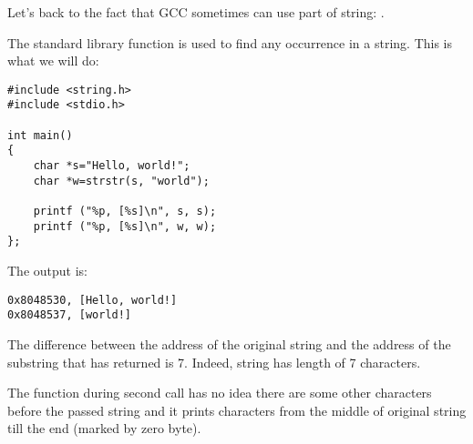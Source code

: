 \label{strstr_example}

Let's back to the fact that GCC sometimes can use part of string: .

The  \CCpp standard library function is used to find any occurrence in a string.
This is what we will do:

\begin{lstlisting}[style=customc]
#include <string.h>
#include <stdio.h>

int main()
{
	char *s="Hello, world!";
	char *w=strstr(s, "world");

	printf ("%p, [%s]\n", s, s);
	printf ("%p, [%s]\n", w, w);
};
\end{lstlisting}

The output is:

\begin{lstlisting}
0x8048530, [Hello, world!]
0x8048537, [world!]
\end{lstlisting}

The difference between the address of the original string and the address of the substring that  has returned is 7.
Indeed,  string has length of 7 characters.

The \printf{} function during second call has no idea there are some other characters before
the passed string and it prints characters
from the middle of original string till the end (marked by zero byte).

